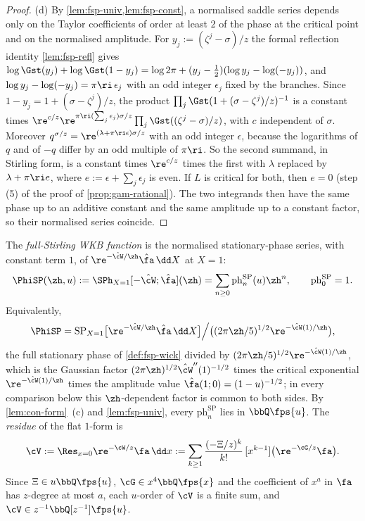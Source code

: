 \begin{proof}
(d) By \cref{lem:fsp-univ,lem:fsp-const}, a normalised saddle series depends only on the Taylor coefficients of order at least $2$ of the phase at the critical point and on the normalised amplitude. For $y_j:=(\zeta^j-\sigma)/z$ the formal reflection identity \cref{lem:fsp-refl} gives $\log\Gst(y_j)+\log\Gst(1-y_j)=\log2\pi+(y_j-\frac12)(\log y_j-\log(-y_j))$, and $\log y_j-\log(-y_j)=\pi\ri\,\epsilon_j$ with an odd integer $\epsilon_j$ fixed by the branches. Since $1-y_j=1+(\sigma-\zeta^j)/z$, the product $\prod_j\Gst(1+(\sigma-\zeta^j)/z)^{-1}$ is a constant times $\re^{c/z}\re^{\pi\ri(\sum_j\epsilon_j)\sigma/z}\prod_j\Gst((\zeta^j-\sigma)/z)$, with $c$ independent of $\sigma$. Moreover $q^{\sigma/z}=\re^{(\lambda+\pi\ri\epsilon)\sigma/z}$ with an odd integer $\epsilon$, because the logarithms of $q$ and of $-q$ differ by an odd multiple of $\pi\ri$. So the second summand, in Stirling form, is a constant times $\re^{c/z}$ times the first with $\lambda$ replaced by $\lambda+\pi\ri e$, where $e:=\epsilon+\sum_j\epsilon_j$ is even. If $L$ is critical for both, then $e=0$ (step (5) of the proof of \cref{prop:gam-rational}). The two integrands then have the same phase up to an additive constant and the same amplitude up to a constant factor, so their normalised series coincide.
\end{proof}

\begin{defn}
\label{def:con-PhiSP}
The \emph{full-Stirling WKB function} is the normalised stationary-phase series, with constant term $1$, of $\re^{-\hat\cW/\zh}\hat\fa\,\dd X$ at $X=1$:
\[
\PhiSP(\zh,u):=\SPh_{X=1}[-\hat\cW;\hat\fa](\zh)=\sum_{n\geq0}\mathrm{ph}^{\mathrm{SP}}_n(u)\zh^n,\qquad\mathrm{ph}^{\mathrm{SP}}_0=1 .
\]
Equivalently,
\[
\PhiSP=\mathrm{SP}_{X=1}\bigl[\re^{-\hat\cW/\zh}\hat\fa\,\dd X\bigr]\Big/\bigl((2\pi\zh/5)^{1/2}\re^{-\hat\cW(1)/\zh}\bigr),
\]
the full stationary phase of \cref{def:fsp-wick} divided by $(2\pi\zh/5)^{1/2}\re^{-\hat\cW(1)/\zh}$, which is the Gaussian factor $(2\pi\zh)^{1/2}\hat\cW''(1)^{-1/2}$ times the critical exponential $\re^{-\hat\cW(1)/\zh}$ times the amplitude value $\hat\fa(1;0)=(1-u)^{-1/2}$; in every comparison below this $\zh$-dependent factor is common to both sides. By \cref{lem:con-form}~(c) and \cref{lem:fsp-univ}, every $\mathrm{ph}^{\mathrm{SP}}_n$ lies in $\bbQ\fps{u}$. The \emph{residue} of the flat $1$-form is
\[
\cV:=\Res_{x=0}\re^{-\cW/z}\fa\,\dd x:=\sum_{k\geq1}\frac{(-\Xi/z)^k}{k!}\,[x^{k-1}]\bigl(\re^{-\cG/z}\fa\bigr).
\]
Since $\Xi\in u\bbQ\fps{u}$, $\cG\in x^4\bbQ\fps{x}$ and the coefficient of $x^a$ in $\fa$ has $z$-degree at most $a$, each $u$-order of $\cV$ is a finite sum, and $\cV\in z^{-1}\bbQ[z^{-1}]\fps{u}$.
\end{defn}

